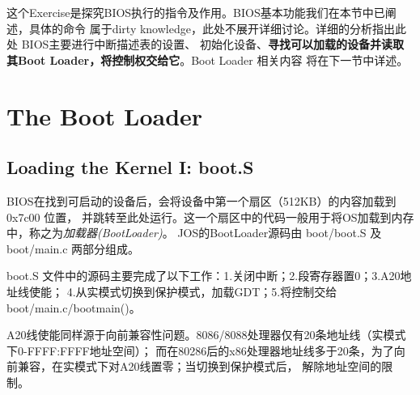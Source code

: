 \documentclass[12pt, letterpaper]{report}
\begin{document}

这个Exercise是探究BIOS执行的指令及作用。BIOS基本功能我们在本节中已阐述，具体的命令
属于dirty knowledge，此处不展开详细讨论。详细的分析指出此处 BIOS主要进行中断描述表的设置、
初始化设备、\textbf{寻找可以加载的设备并读取其Boot Loader，将控制权交给它}。Boot Loader 相关内容
将在下一节中详述。


\chapter[\Large The Boot Loader]{The Boot Loader}
\section[\large Loading the Kernel I: boot.S]{Loading the Kernel I: boot.S}
BIOS在找到可启动的设备后，会将设备中第一个扇区（512KB）的内容加载到 0x7c00 位置，
并跳转至此处运行。这一个扇区中的代码一般用于将OS加载到内存中，称之为\textsl{加载器(BootLoader)}。
JOS的BootLoader源码由 boot/boot.S 及 boot/main.c 两部分组成。 \par

boot.S 文件中的源码主要完成了以下工作：1.关闭中断；2.段寄存器置0；3.A20地址线使能；
4.从实模式切换到保护模式，加载GDT；5.将控制交给 boot/main.c/bootmain()。 \par

A20线使能同样源于向前兼容性问题。8086/8088处理器仅有20条地址线（实模式下0-FFFF:FFFF地址空间）；
而在80286后的x86处理器地址线多于20条，为了向前兼容，在实模式下对A20线置零；当切换到保护模式后，
解除地址空间的限制。\par 
\end{document}
